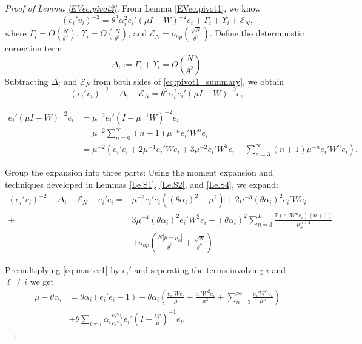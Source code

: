 \documentclass[11pt, reqno]{amsart}
\numberwithin{equation}{section}
\begin{document}
\begin{proof}[Proof of Lemma \ref{EVec.pivot2}]
From Lemma \ref{EVec.pivot1}, we know
\begin{equation}\label{eq:pivot1_summary}
(e_i'v_i)^{-2} = \theta^2\alpha_i^2 e_i'(\mu I - W)^{-2} e_i + \Gamma_i + \Upsilon_i + \mathcal{E}_N,
\end{equation}
where $\Gamma_i = O\left(\frac{N}{\theta^2}\right)$, $\Upsilon_i = O\left(\frac{N}{\theta^2}\right)$, and $\mathcal{E}_N = o_{hp}\left(\frac{\sqrt{N}}{\theta^2}\right)$.
Define the deterministic correction term
\[ \Delta_i := \Gamma_i + \Upsilon_i = O\left(\frac{N}{\theta^2}\right). \]
Subtracting $\Delta_i$ and $\mathcal{E}_N$ from both sides of \eqref{eq:pivot1_summary}, we obtain
\begin{equation}\label{eq:pivot1_reduced}
(e_i'v_i)^{-2} - \Delta_i - \mathcal{E}_N = \theta^2\alpha_i^2 e_i'(\mu I - W)^{-2} e_i.
\end{equation}


\begin{align*}
e_i'(\mu I - W)^{-2}e_i &= \mu^{-2} e_i' (I - \mu^{-1} W)^{-2} e_i \\
&= \mu^{-2} \sum_{n=0}^\infty (n+1) \mu^{-n} e_i' W^n e_i \\
&= \mu^{-2} \left( e_i'e_i + 2 \mu^{-1} e_i'We_i + 3 \mu^{-2} e_i'W^2e_i + \sum_{n=3}^\infty (n+1) \mu^{-n} e_i'W^n e_i \right).
\end{align*}


Group the expansion into three parts:
Using the moment expansion and techniques developed in Lemmas \ref{Le.S1}, \ref{Le.S2}, and \ref{Le.S4}, we expand:
\begin{align}
\nonumber (e_i'v_i)^{-2} - \Delta_i - \mathcal{E}_N  - e_i'e_i = &\mu^{-2}e_i'e_i\left((\theta\alpha_i)^2 - \mu^2\right) +  2\mu^{-3}(\theta\alpha_i)^2 e_i'We_i \\
\label{EVec.pivot2.interm1}+ & 3\mu^{-4}(\theta\alpha_i)^2 e_i'W^2e_i + (\theta\alpha_i)^2 \sum_{n=3}^L \frac{\mathbb E(e_i' W^n e_i)(n+1)}{\mu_0^{n+2}} \\
\nonumber & + o_{hp}\left(\frac{N|\mu - \mu_0|}{\theta^3} + \frac{\sqrt{N}}{\theta^2}\right)
\end{align}

Premultiplying \eqref{eq.master1} by $e_i'$ and seperating the terms involving $i$ and $\ell\neq i$ we get
\begin{align}
\nonumber \mu - \theta\alpha_i &= \theta\alpha_i(e_i'e_i - 1) + \theta\alpha_i\left(\frac{e_i'We_i}{\mu} + \frac{e_i'W^2e_i}{\mu^2} + \sum_{n=3}^{\infty} \frac{e_i'W^n e_i}{\mu^n} \right) \\
\label{EVec.pivot2.interm2} & + \theta \sum_{l \ne i} \alpha_l \frac{e_l'v_i}{e_i'v_i} e_i' \left(I - \frac{W}{\mu}\right)^{-1} e_l.
\end{align}


\end{proof}
\end{document}
